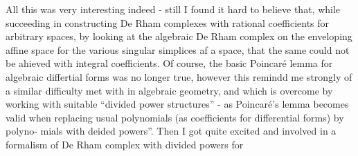 All this  was very interesting indeed  -  still I found
it hard to believe that,  while succeeding in constructing De Rham 
complexes with rational coefficients for arbitrary spaces,  by looking
at the algebraic De Rham complex on the enveloping affine space for
the various singular simplices af a space,  that the same could not be
ahieved with integral coefficients.  Of course,  the basic Poincaré
lemma for algebraic differtial forms was no longer true,  however
this remindd  me strongly of a similar difficulty met with in algebraic
geometry,  and which is overcome by working with suitable ``divided
power structures''  -  as Poincaré's lemma becomes valid when replacing
usual polynomials (as coefficients for differential forms)  by polyno-%
mials with deided powers''.  Then I got quite excited and involved in
 a formalism of De Rham complex with divided powers  for


